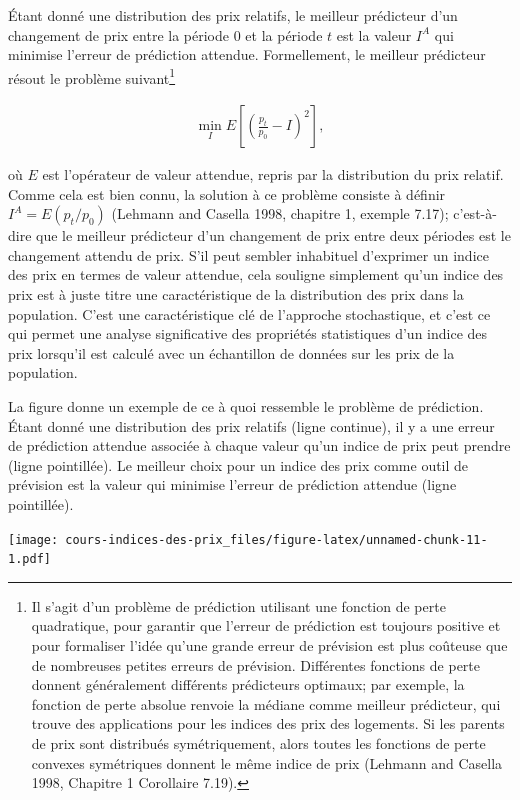 \documentclass[]{article}
\begin{document}
Étant donné une distribution des prix relatifs, le meilleur prédicteur d'un changement de prix entre la période 0 et la période \(t\) est la valeur \(I^{A}\) qui minimise l'erreur de prédiction attendue. Formellement, le meilleur prédicteur résout le problème suivant\footnote{Il s'agit d'un problème de prédiction utilisant une fonction de perte quadratique, pour garantir que l'erreur de prédiction est toujours positive et pour formaliser l'idée qu'une grande erreur de prévision est plus coûteuse que de nombreuses petites erreurs de prévision. Différentes fonctions de perte donnent généralement différents prédicteurs optimaux; par exemple, la fonction de perte absolue renvoie la médiane comme meilleur prédicteur, qui trouve des applications pour les indices des prix des logements. Si les parents de prix sont distribués symétriquement, alors toutes les fonctions de perte convexes symétriques donnent le même indice de prix (Lehmann and Casella 1998, Chapitre 1 Corollaire 7.19).}

\begin{align*}
\min_{I} E\left[\left(\frac{p_{t}}{p_{0}} - I \right)^{2} \right],
\end{align*}

où \(E\) est l'opérateur de valeur attendue, repris par la distribution du prix relatif. Comme cela est bien connu, la solution à ce problème consiste à définir \(I^{A} = E(p_{t} / p_{0})\) (Lehmann and Casella 1998, chapitre 1, exemple 7.17); c'est-à-dire que le meilleur prédicteur d'un changement de prix entre deux périodes est le changement attendu de prix. S'il peut sembler inhabituel d'exprimer un indice des prix en termes de valeur attendue, cela souligne simplement qu'un indice des prix est à juste titre une caractéristique de la distribution des prix dans la population. C'est une caractéristique clé de l'approche stochastique, et c'est ce qui permet une analyse significative des propriétés statistiques d'un indice des prix lorsqu'il est calculé avec un échantillon de données sur les prix de la population.

La figure donne un exemple de ce à quoi ressemble le problème de prédiction. Étant donné une distribution des prix relatifs (ligne continue), il y a une erreur de prédiction attendue associée à chaque valeur qu'un indice de prix peut prendre (ligne pointillée). Le meilleur choix pour un indice des prix comme outil de prévision est la valeur qui minimise l'erreur de prédiction attendue (ligne pointillée).

\texttt{[image: cours-indices-des-prix\_files/figure-latex/unnamed-chunk-11-1.pdf]}
\end{document}
